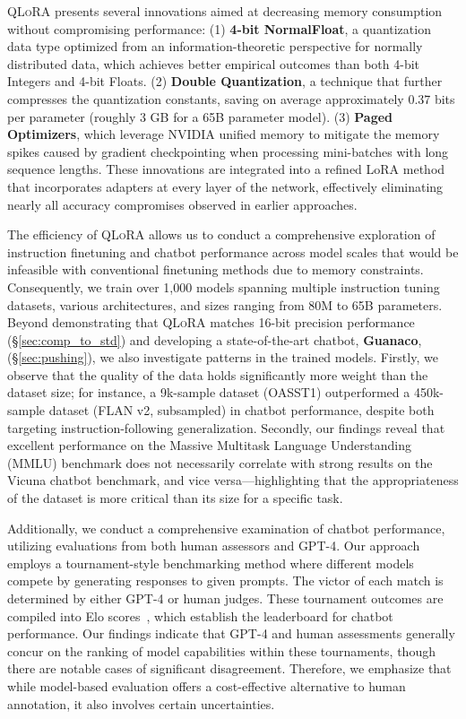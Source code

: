 \textsc{QLoRA} presents several innovations aimed at decreasing memory consumption without compromising performance: (1) \textbf{4-bit NormalFloat}, a quantization data type optimized from an information-theoretic perspective for normally distributed data, which achieves better empirical outcomes than both 4-bit Integers and 4-bit Floats. (2) \textbf{Double Quantization}, a technique that further compresses the quantization constants, saving on average approximately 0.37 bits per parameter (roughly 3 GB for a 65B parameter model). (3) \textbf{Paged Optimizers}, which leverage NVIDIA unified memory to mitigate the memory spikes caused by gradient checkpointing when processing mini-batches with long sequence lengths. These innovations are integrated into a refined LoRA method that incorporates adapters at every layer of the network, effectively eliminating nearly all accuracy compromises observed in earlier approaches.

The efficiency of \textsc{QLoRA} allows us to conduct a comprehensive exploration of instruction finetuning and chatbot performance across model scales that would be infeasible with conventional finetuning methods due to memory constraints. Consequently, we train over 1,000 models spanning multiple instruction tuning datasets, various architectures, and sizes ranging from 80M to 65B parameters. Beyond demonstrating that \textsc{QLoRA} matches 16-bit precision performance (\S\ref{sec:comp_to_std}) and developing a state-of-the-art chatbot, \textbf{Guanaco}, (\S\ref{sec:pushing}), we also investigate patterns in the trained models. Firstly, we observe that the quality of the data holds significantly more weight than the dataset size; for instance, a 9k-sample dataset (OASST1) outperformed a 450k-sample dataset (FLAN v2, subsampled) in chatbot performance, despite both targeting instruction-following generalization. Secondly, our findings reveal that excellent performance on the Massive Multitask Language Understanding (MMLU) benchmark does not necessarily correlate with strong results on the Vicuna chatbot benchmark, and vice versa—highlighting that the appropriateness of the dataset is more critical than its size for a specific task.

Additionally, we conduct a comprehensive examination of chatbot performance, utilizing evaluations from both human assessors and GPT-4. Our approach employs a tournament-style benchmarking method where different models compete by generating responses to given prompts. The victor of each match is determined by either GPT-4 or human judges. These tournament outcomes are compiled into Elo scores~\citep{elo1967proposed, elo1978rating}, which establish the leaderboard for chatbot performance. Our findings indicate that GPT-4 and human assessments generally concur on the ranking of model capabilities within these tournaments, though there are notable cases of significant disagreement. Therefore, we emphasize that while model-based evaluation offers a cost-effective alternative to human annotation, it also involves certain uncertainties.

